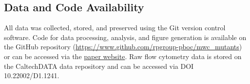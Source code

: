 \subsection{Data and Code Availability}
All data was collected, stored, and preserved using the Git version control
software. Code for data processing, analysis, and figure generation is
available on the GitHub repository
(\href{https://www.github.com/rpgroup-pboc/mwc_mutants}{https://www.github.com/rpgroup-pboc/mwc\_mutants})
or can be accessed via the
\href{http://www.rpgroup.caltech.edu/mwc_mutants}{paper website}. Raw flow
cytometry data is stored on the CaltechDATA data repository and can be
accessed via DOI 10.22002/D1.1241.
